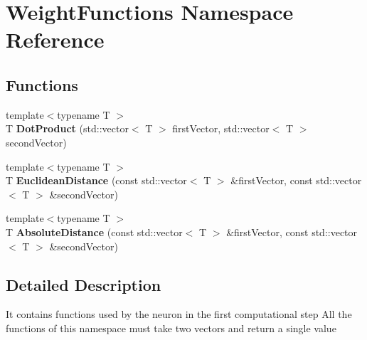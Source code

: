 \hypertarget{namespace_weight_functions}{\section{Weight\-Functions Namespace Reference}
\label{namespace_weight_functions}
}
\subsection*{Functions}
\begin{DoxyCompactItemize}
\item 
\hypertarget{namespace_weight_functions_af2f1f0988f1df58825209c226465e830}{{\footnotesize template$<$typename T $>$ }\\T {\bfseries Dot\-Product} (std\-::vector$<$ T $>$ first\-Vector, std\-::vector$<$ T $>$ second\-Vector)}\label{namespace_weight_functions_af2f1f0988f1df58825209c226465e830}

\item 
\hypertarget{namespace_weight_functions_a27358e283ad7dc4ced43c337ceb0a0b3}{{\footnotesize template$<$typename T $>$ }\\T {\bfseries Euclidean\-Distance} (const std\-::vector$<$ T $>$ \&first\-Vector, const std\-::vector$<$ T $>$ \&second\-Vector)}\label{namespace_weight_functions_a27358e283ad7dc4ced43c337ceb0a0b3}

\item 
\hypertarget{namespace_weight_functions_a8f0c5cfc7d40ba24483186d740b233f4}{{\footnotesize template$<$typename T $>$ }\\T {\bfseries Absolute\-Distance} (const std\-::vector$<$ T $>$ \&first\-Vector, const std\-::vector$<$ T $>$ \&second\-Vector)}\label{namespace_weight_functions_a8f0c5cfc7d40ba24483186d740b233f4}

\end{DoxyCompactItemize}


\subsection{Detailed Description}
It contains functions used by the neuron in the first computational step All the functions of this namespace must take two vectors and return a single value 